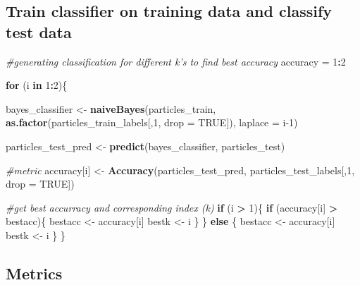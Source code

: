 \documentclass[
]{article}
\newenvironment{Shaded}{\begin{snugshade}}{\end{snugshade}}
\newcommand{\CommentTok}[1]{\textcolor[rgb]{0.56,0.35,0.01}{\textit{#1}}}
\newcommand{\ControlFlowTok}[1]{\textcolor[rgb]{0.13,0.29,0.53}{\textbf{#1}}}
\newcommand{\DataTypeTok}[1]{\textcolor[rgb]{0.13,0.29,0.53}{#1}}
\newcommand{\DecValTok}[1]{\textcolor[rgb]{0.00,0.00,0.81}{#1}}
\newcommand{\KeywordTok}[1]{\textcolor[rgb]{0.13,0.29,0.53}{\textbf{#1}}}
\newcommand{\NormalTok}[1]{#1}
\newcommand{\OperatorTok}[1]{\textcolor[rgb]{0.81,0.36,0.00}{\textbf{#1}}}
\newcommand{\OtherTok}[1]{\textcolor[rgb]{0.56,0.35,0.01}{#1}}
\newcommand{\StringTok}[1]{\textcolor[rgb]{0.31,0.60,0.02}{#1}}
\begin{document}
\hypertarget{train-classifier-on-training-data-and-classify-test-data}{%
\subsection{Train classifier on training data and classify test
data}\label{train-classifier-on-training-data-and-classify-test-data}}

\begin{Shaded}
\begin{Highlighting}[]
\CommentTok{#generating classification for different k's to find best accuracy}
\NormalTok{accuracy =}\StringTok{ }\DecValTok{1}\OperatorTok{:}\DecValTok{2}

\ControlFlowTok{for}\NormalTok{ (i }\ControlFlowTok{in} \DecValTok{1}\OperatorTok{:}\DecValTok{2}\NormalTok{)\{}

\NormalTok{  bayes_classifier <-}\StringTok{ }\KeywordTok{naiveBayes}\NormalTok{(particles_train, }\KeywordTok{as.factor}\NormalTok{(particles_train_labels[,}\DecValTok{1}\NormalTok{, }\DataTypeTok{drop =} \OtherTok{TRUE}\NormalTok{]), }\DataTypeTok{laplace =}\NormalTok{ i}\DecValTok{-1}\NormalTok{)}

\NormalTok{  particles_test_pred <-}\StringTok{ }\KeywordTok{predict}\NormalTok{(bayes_classifier, particles_test)}
    
  \CommentTok{#metric}
\NormalTok{  accuracy[i] <-}\StringTok{ }\KeywordTok{Accuracy}\NormalTok{(particles_test_pred, particles_test_labels[,}\DecValTok{1}\NormalTok{, }\DataTypeTok{drop =} \OtherTok{TRUE}\NormalTok{])}

\CommentTok{#get best accurracy and corresponding index (k)}
  \ControlFlowTok{if}\NormalTok{ (i }\OperatorTok{>}\StringTok{ }\DecValTok{1}\NormalTok{)\{}
    \ControlFlowTok{if}\NormalTok{ (accuracy[i] }\OperatorTok{>}\StringTok{ }\NormalTok{bestacc)\{}
\NormalTok{      bestacc <-}\StringTok{ }\NormalTok{accuracy[i]}
\NormalTok{      bestk <-}\StringTok{ }\NormalTok{i}
\NormalTok{    \}}
\NormalTok{  \} }\ControlFlowTok{else}\NormalTok{ \{}
\NormalTok{    bestacc <-}\StringTok{ }\NormalTok{accuracy[i]}
\NormalTok{    bestk <-}\StringTok{ }\NormalTok{i}
\NormalTok{  \}}
\NormalTok{\}}
\end{Highlighting}
\end{Shaded}

\hypertarget{metrics}{%
\subsection{Metrics}\label{metrics}}
\end{document}
